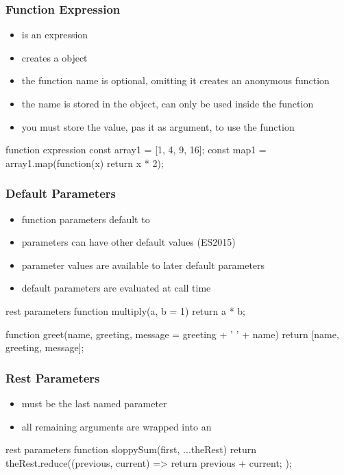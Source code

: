 \begin{frame}[fragile] \frametitle{Function Expression}

\begin{itemize}
  \item is an expression
  \item creates a  object
  \item the function name is optional, omitting it creates an anonymous function
  \item the name is stored in the  object, can only be used inside the function
  \item you must store the value, pas it as argument, to use the function
\end{itemize}
\begin{CodeBox}{function expression}
const array1 = [1, 4, 9, 16];
const map1 = array1.map(function(x) { return  x * 2});
\end{CodeBox}
\end{frame}

\begin{frame}[fragile] \frametitle{Default Parameters}
\begin{itemize}
  \item function parameters default to 
  \item parameters can have other default values (ES2015)
  \item parameter values are available to later default parameters
  \item default parameters are evaluated at call time
\end{itemize}

\begin{CodeBox}{rest parameters}
function multiply(a, b = 1) {
  return a * b;
}

function greet(name, 
                    greeting,
                    message = greeting + ' ' + name) {
    return [name, greeting, message];
}
\end{CodeBox}
\end{frame}

\begin{frame}[fragile] \frametitle{Rest Parameters}
\begin{itemize}
  \item must be the last named parameter
  \item all remaining arguments are wrapped into an 
\end{itemize}
\vspace{5mm}

\begin{CodeBox}{rest parameters}
function sloppySum(first, ...theRest) {
  return theRest.reduce((previous, current) => {
    return previous + current;
  });
}
\end{CodeBox}
\end{frame}

